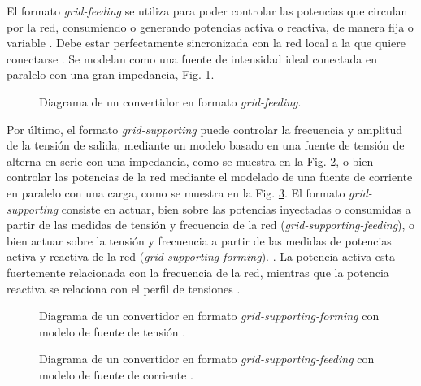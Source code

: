 \documentclass{report}
\begin{document}
El formato \textit{grid-feeding} se utiliza para poder controlar las potencias que circulan por la red, consumiendo o generando potencias activa o reactiva, de manera fija o variable \cite{dos}. Debe estar perfectamente sincronizada con la red local a la que quiere conectarse \cite{ocho}. Se modelan como una fuente de intensidad ideal conectada en paralelo con una gran impedancia, Fig. \ref{fig.grid-feeding-diagram}. 


\begin{figure}[!h]
    \begin{center}
    \end{center}
    \caption{Diagrama de un convertidor en formato \textit{grid-feeding}\cite{nueve}.}
    \label{fig.grid-feeding-diagram}
    \end{figure}

Por último, el formato \textit{grid-supporting} puede controlar la frecuencia y amplitud de la tensión de salida, mediante un modelo basado en una fuente de tensión de alterna en serie con una impedancia, como se muestra en la Fig. \ref{fig.grid-forming-supporting-diagram}, o bien controlar las potencias de la red mediante el modelado de una fuente de corriente en paralelo con una carga, como se muestra en la Fig. \ref{fig.grid-feeding-supporting-diagram}. El formato \textit{grid-supporting} consiste en actuar, bien sobre las potencias inyectadas o consumidas a partir de las medidas de tensión y frecuencia de la red (\textit{grid-supporting-feeding}), o bien actuar sobre la tensión y frecuencia a partir de las medidas de potencias activa y reactiva de la red (\textit{grid-supporting-forming}). \cite{seis}. La potencia activa esta fuertemente relacionada con la frecuencia de la red, mientras que la potencia reactiva se relaciona con el perfil de tensiones \cite{cuarentaycinco}.



\begin{figure}[!h]
    \begin{center}
    \end{center}
    \caption{Diagrama de un convertidor en formato \textit{grid-supporting-forming} con modelo de fuente de tensión \cite{seis}.}
    \label{fig.grid-forming-supporting-diagram}
    \end{figure}
    
\begin{figure}[!h]
    \begin{center}
    \end{center}
    \caption{Diagrama de un convertidor en formato \textit{grid-supporting-feeding} con modelo de fuente de corriente \cite{seis}.}
    \label{fig.grid-feeding-supporting-diagram}
    \end{figure}
\end{document}
